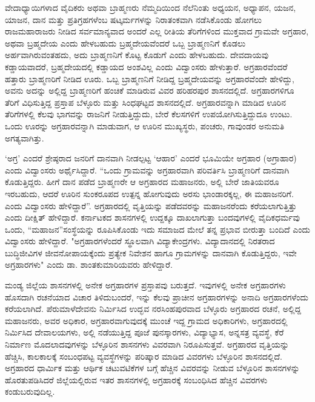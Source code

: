 ವೇದಾಧ್ಯಾಯಿಗಳಾದ ವೈದಿಕರು ಅಥವಾ ಬ್ರಾಹ್ಮಣರು ನೆಮ್ಮದಿಯಿಂದ ನೆಲೆನಿಂತು ಅಧ್ಯಯನ, ಅಧ್ಯಾಪನ, ಯಜನ, ಯಾಜನ, ದಾನ ಮತ್ತು ಪ್ರತಿಗ್ರಹಗಳೆಂಬ ಷಟ್ಕರ್ಮಗಳನ್ನು ನಿರಾತಂಕವಾಗಿ ನಡೆಸಿಕೊಂಡು ಹೋಗಲು ರಾಜಮಹಾರಾಜರು ನೀಡಿದ ಸರ್ವಮಾನ್ಯವಾದ ಅಂದರೆ ಎಲ್ಲ ರೀತಿಯ ತೆರಿಗೆಗಳಿಂದ ಮುಕ್ತವಾದ ಗ್ರಾಮವೇ ಅಗ್ರಹಾರ, ಅಥವಾ ಬ್ರಹ್ಮದೇಯ ಎಂದು ಹೇಳಬಹುದು ಬ್ರಹ್ಮದೇಯವೆಂದರೆ ಒಬ್ಬ ಬ್ರಾಹ್ಮಣನಿಗೆ ಕೊಡಲು ಅರ್ಹವಾಗಿರುವಂತಹದು, ಅದು ಬ್ರಾಹ್ಮಣನಿಗೆ ಕೊಟ್ಟ ಕೊಡುಗೆ ಎಂದು ಹೇಳಬಹುದು. ದೇವದಾಯವು ಕಡ್ಡಾಯವಾದರೆ, ಬ್ರಹ್ಮದೇಯದಲ್ಲಿ ಕಡ್ಡಾಯದ ಅಂಶವಿಲ್ಲ ಎಂದು ವಿದ್ವಾಂಸರು ಹೇಳುತ್ತಾರೆ. ಅಗ್ರಹಾರವೆಂದರೆ ಹತ್ತಾರು ಬ್ರಾಹ್ಮಣರಿಗೆ ನೀಡಿದ ಊರು. ಒಬ್ಬ ಬ್ರಾಹ್ಮಣನಿಗೆ ನೀಡಿದ್ದ ಬ್ರಹ್ಮದೇಯವನ್ನು ಅಗ್ರಹಾರವೆಂದೇ ಹೇಳಿದ್ದು, ಅವನು ಅದನ್ನು ಅಲ್ಲಿದ್ದ ಬ್ರಾಹ್ಮಣರಿಗೆ ಹಂಚಿಕೆ ಮಾಡಿರುವ ವಿವರ ಹರಿಹರಪುರ ಶಾಸನದಲ್ಲಿದೆ. ಅಗ್ರಹಾರಗಳಿಗೂ ತೆರಿಗೆ ವಿಧಿಸುತ್ತಿದ್ದ ಪ್ರಸ್ತಾಪ ಬೆಳ್ಳೂರು ಮತ್ತು ಸಿಂಧಘಟ್ಟದ ಶಾಸನದಲ್ಲಿದೆ. ಅಗ್ರಹಾರವನ್ನಾಗಿ ಮಾಡಿದ ಊರಿನ ತೆರಿಗೆಗಳಲ್ಲಿ ಕೆಲವು ಭಾಗವನ್ನು ರಾಜನಿಗೆ ನೀಡುತ್ತಿದ್ದುದು, ಬೇರೆ ಕೆಲಸಗಳಿಗೆ ಉಪಯೋಗಿಸುತ್ತಿದ್ದುದೂ ಉಂಟು. ಒಂದು ಊರನ್ನು ಅಗ್ರಹಾರವನ್ನಾಗಿ ಮಾಡುವಾಗ, ಆ ಊರಿನ ಮುಖ್ಯಸ್ಥರು, ಪಂಚರು, ಗಾವುಂಡರ ಅನುಮತಿ ಅಗತ್ಯವಾಗಿತ್ತು.

‘ಅಗ್ರ’ ಎಂದರೆ ಶ್ರೇಷ್ಠರಾದ ಜನರಿಗೆ ದಾನವಾಗಿ ನೀಡಲ್ಪಟ್ಟ ‘ಆಹಾರ’ ಎಂದರೆ ಭೂಮಿಯೇ ಅಗ್ರಹಾರ (ಅಗ್ರಾಹಾರ) ಎಂದು ವಿದ್ವಾಂಸರು ಅರ್ಥೈಸಿದ್ದಾರೆ. “ಒಂದು ಗ್ರಾಮವನ್ನು ಅಗ್ರಹಾರವಾಗಿ ಪರಿವರ್ತಿಸಿ ಬ್ರಾಹ್ಮಣರಿಗೆ ದಾನವಾಗಿ ಕೊಡುತ್ತಿದ್ದರು. ಹೀಗೆ ದಾನ ಪಡೆದ ಬ್ರಾಹ್ಮಣರೇ ಆ ಅಗ್ರಹಾರದ ಮಹಾಜನರು, ಅಲ್ಲಿ ಬೇರೆ ಜಾತಿಯವರೂ ಇರಬಹುದು, ಆದರೆ ಊರಿನ ಸುಂಕರೂಪದ ಉತ್ಪನ್ನ ಹೋಗುವುದು ಅರಸು ಭಾಂಡಾರಕ್ಕಲ್ಲ, ಈ ಮಹಾಜನರಿಗೆ. ಎಂದು ವಿದ್ವಾಂಸರು ಹೇಳಿದ್ದಾರೆ”. ಅಗ್ರಹಾರದಲ್ಲಿ ವೃತ್ತಿಯನ್ನು ಪಡೆದವರನ್ನು ಮಹಾಜನರೆಂದು ಕರೆಯಲಾಗುತ್ತಿತ್ತು ಎಂದು ದೀಕ್ಷಿತ್​ ಹೇಳಿದ್ದಾರೆ. ಕರ್ನಾಟಕದ ಶಾಸನಗಳಲ್ಲಿ ಉದ್ದಕ್ಕೂ ದಾಖಲಾಗುತ್ತಾ ಬಂದವುಗಳಲ್ಲಿ ವೈದಿಕಧರ್ಮವು ಒಂದು, “ಮಹಾಜನ”ಸಂಸ್ಥೆಯನ್ನು ರೂಪಿಸಿಕೊಂಡು ಇದು ಸಮಾಜದ ಮೇಲೆ ತನ್ನ ಪ್ರಭಾವ ಬೀರುತ್ತಾ ಬಂದಿದೆ ಎಂದು ವಿದ್ವಾಂಸರು ಹೇಳಿದ್ದಾರೆ. "ಅಗ್ರಹಾರಗಳೆಂದರೆ ಸ್ಥೂಲವಾಗಿ ವಿದ್ಯಾಕೇಂದ್ರಗಳು. ವಿದ್ಯಾದಾನದಲ್ಲಿ ನಿರತರಾದ ಬುದ್ಧಿಜೀವಿಗಳ ಜೀವನೋಪಾಯಕ್ಕೆಂದು ಪ್ರತ್ಯೇಕ ನಿವೇಶನ ಹಾಗೂ ಗ್ರಾಮಗಳನ್ನು ದಾನವಾಗಿ ಕೊಡುತ್ತಿದ್ದರು, ಇವೇ ಅಗ್ರಹಾರಗಳು" ಎಂದು ಡಾ. ಶಾಂತಕುಮಾರಿ\-ಯವರು ಹೇಳಿದ್ದಾರೆ.

ಮಂಡ್ಯ ಜಿಲ್ಲೆಯ ಶಾಸನಗಳಲ್ಲಿ ಅನೇಕ ಅಗ್ರಹಾರಗಳ ಪ್ರಸ್ತಾಪವು ಬರುತ್ತದೆ. ಇವುಗಳಲ್ಲಿ ಅನೇಕ ಅಗ್ರಹಾರಗಳು ಹೊಸದಾಗಿ ರಚನೆಯಾದ ವಿಚಾರ ತಿಳಿದುಬಂದರೆ, ಇನ್ನು ಕೆಲವು ಪ್ರಾಚೀನ ಅಗ್ರಹಾರಗಳನ್ನು ಅನಾದಿ ಅಗ್ರಹಾರಗಳೆಂದು ಕರೆಯಲಾಗಿದೆ. ಪೆರುಮಾಳೆದೇವನು ನಿರ್ಮಿಸಿದ ಉದ್ಭವ ನರಸಿಂಹಪುರವಾದ ಬೆಳ್ಳೂರು ಅಗ್ರಹಾರದ ರಚನೆ, ಅಲ್ಲಿದ್ದ ಮಹಾಜನರು, ಅವರ ಅಧಿಕಾರ, ಅಗ್ರಹಾರವಾಗುವುದಕ್ಕೆ ಮುಂಚೆ ಇದ್ದ ಗ್ರಾಮದ ಅಧಿಕಾರಿಗಳು, ಅಗ್ರಹಾರದಲ್ಲಿ ನಿರ್ಮಿಸಿದ ದೇವಾಲಯಗಳು, ಅಲ್ಲಿ ನಡೆಯುತ್ತಿದ್ದ ಪೂಜೆ ಪುನಸ್ಕಾರಗಳು, ವಿದ್ಯಾಭ್ಯಾಸ, ಅನ್ನಸತ್ರ ವ್ಯವಸ್ಥೆ, ಕೆರೆ ನಿರ್ಮಾಣ ಮೊದಲಾದವುಗಳನ್ನು ಬೆಳ್ಳೂರಿನ ಶಾಸನಗಳು ವಿವರವಾಗಿ ನಿರೂಪಿಸುತ್ತವೆ. ಅಗ್ರಹಾರದ ವೃತ್ತಿಯನ್ನು ಹೆಚ್ಚಿಸಿ, ಕಾಲಕಾಲಕ್ಕೆ ಸಂಬಂಧಪಟ್ಟ ವ್ಯವಸ್ಥೆಗಳನ್ನು ಪರಿಷ್ಕಾರ ಮಾಡಿದ ವಿವರಗಳು ಬೆಳ್ಳೂರಿನ ಶಾಸನದಲ್ಲಿದೆ. ಅಗ್ರಹಾರದ ಧಾರ್ಮಿಕ ಮತ್ತು ಆರ್ಥಿಕ ಚಟುವಟಿಕೆಗಳ ಬಗ್ಗೆ ಹೆಚ್ಚಿನ ವಿವರವನ್ನು ನೀಡುವ ಬೆಳ್ಳೂರಿನ ಶಾಸನಗಳನ್ನು ಹೊರತುಪಡಿಸಿದರೆ ಜಿಲ್ಲೆಯಲ್ಲಿರುವ ಇತರ ಶಾಸನಗಳಲ್ಲಿ ಅಗ್ರಹಾರಕ್ಕೆ ಸಂಬಂಧಿಸಿದ ಹೆಚ್ಚಿನ ವಿವರಗಳು ಕಂಡುಬರುವುದಿಲ್ಲ.

